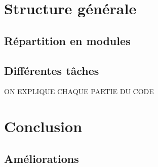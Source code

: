 \documentclass[a4paper,12pt]{article}
\begin{document}
	
\section{Structure générale}

	\subsection{Répartition en modules}
	
	\subsection{Différentes tâches}
	
		ON EXPLIQUE CHAQUE PARTIE DU CODE
	
	
\section{Conclusion}
	
	\subsection{Améliorations}
\end{document}
